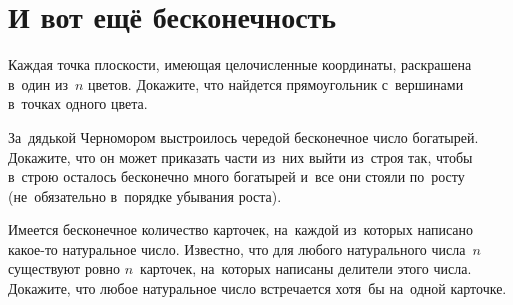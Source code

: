 
\section*{И вот ещё бесконечность}


\begin{problems}

\item
Каждая точка плоскости, имеющая целочисленные координаты, раскрашена в~один
из~$n$ цветов.
Докажите, что найдется прямоугольник с~вершинами в~точках одного цвета.

\item
За~дядькой Черномором выстроилось чередой бесконечное число богатырей.
Докажите, что он может приказать части из~них выйти из~строя так, чтобы в~строю
осталось бесконечно много богатырей и~все они стояли по~росту (не~обязательно
в~порядке убывания роста).

\item
Имеется бесконечное количество карточек, на~каждой из~которых написано какое-то
натуральное число.
Известно, что для любого натурального числа~$n$ существуют ровно $n$~карточек,
на~которых написаны делители этого числа.
Докажите, что любое натуральное число встречается хотя~бы на~одной карточке.

\end{problems}

